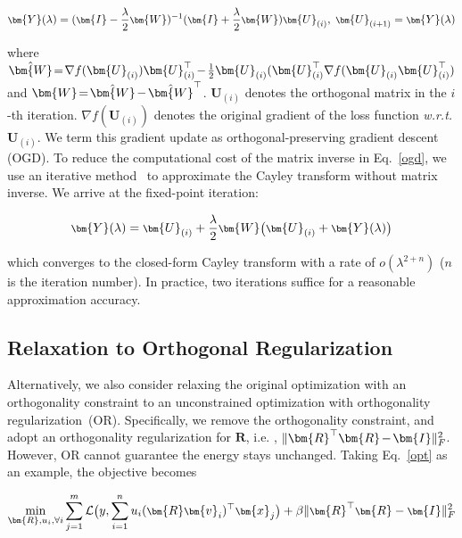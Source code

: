 \begin{equation}\label{ogd}
\footnotesize
\bm{Y}(\lambda)=(\bm{I}-\frac{\lambda}{2}\bm{W})^{-1}(\bm{I}+\frac{\lambda}{2}\bm{W})\bm{U}_{(i)},\ \bm{U}_{(i+1)}=\bm{Y}(\lambda)
\end{equation}

 where $\thickmuskip=2mu \medmuskip=2mu \hat{\bm{W}}=\nabla f(\bm{U}_{(i)})\bm{U}_{(i)}^\top-\frac{1}{2}\bm{U}_{(i)}(\bm{U}_{(i)}^\top\nabla f(\bm{U}_{(i)}\bm{U}_{(i)}^\top)$ and $\thickmuskip=2mu \medmuskip=2mu\bm{W}=\hat{\bm{W}}-\hat{\bm{W}}^\top$. $\bm{U}_{(i)}$ denotes the orthogonal matrix in the $i$-th iteration. $\nabla f(\bm{U}_{(i)})$ denotes the original gradient of the loss function \emph{w.r.t.} $\bm{U}_{(i)}$. We term this gradient update as orthogonal-preserving gradient descent (OGD). To reduce the computational cost of the matrix inverse in Eq.~\ref{ogd}, we use an iterative method~\cite{Li2020Efficient} to approximate the Cayley transform without matrix inverse. We arrive at the fixed-point iteration:

\begin{equation}
\footnotesize
    \bm{Y}(\lambda)=\bm{U}_{(i)}+\frac{\lambda}{2}\bm{W}\big(\bm{U}_{(i)}+\bm{Y}(\lambda)\big)
\end{equation}

 which converges to the closed-form Cayley transform with a rate of $o(\lambda^{2+n})$ ($n$ is the iteration number). In practice, two iterations suffice for a reasonable approximation accuracy.

\subsection{Relaxation to Orthogonal Regularization}

Alternatively, we also consider relaxing the original optimization with an orthogonality constraint to an unconstrained optimization with orthogonality regularization~(OR). Specifically, we remove the orthogonality constraint, and adopt an orthogonality regularization for $\bm{R}$, i.e. ,  $\thickmuskip=9mu \medmuskip=2mu \|\bm{R}^\top\bm{R}-\bm{I}\|_F^2$. However, OR cannot guarantee the energy stays unchanged. Taking Eq.~\ref{opt} as an example, the objective becomes

\begin{equation}
\footnotesize
    \min_{\bm{R},u_i,\forall i} \sum_{j=1}^{m}\mathcal{L}\big(y,\sum_{i=1}^{n} u_i(\bm{R}\bm{v}_i)^\top\bm{x}_j\big)+\beta\|\bm{R}^\top\bm{R}-\bm{I}\|_F^2
\end{equation}

